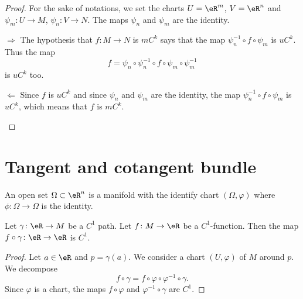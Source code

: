 \begin{proof}
    For the sake of notations, we set the charts \( U=\eR^m\), \( V=\eR^n\) and \( \psi_m\colon U\to M\), \( \psi_n\colon V\to N\). The maps \( \psi_n\) and \( \psi_m\) are the identity.
    \begin{subproof}
    \item[\( \Rightarrow\)]
        The hypothesis that \( f\colon M\to N\) is \( mC^k\) says that the map \( \psi_n^{-1}\circ f\circ\psi_m\) is \( uC^k\). Thus the map
        \begin{equation}
            f=\psi_n\circ\psi_n^{-1}\circ f\circ\psi_m\circ\psi_m^{-1}
        \end{equation}
        is \( uC^k\) too.
    \item[\( \Leftarrow\)]
        Since \( f\) is \( uC^k\) and since \( \psi_n\) and \( \psi_m\) are the identity, the map \( \psi_n^{-1}\circ f\circ\psi_m\) is \( uC^k\), which means that \( f\) is \( mC^k\).
    \end{subproof}
\end{proof}


\section{Tangent and cotangent bundle}

\begin{definition}
    An open set \( \Omega\subset \eR^n\) is a manifold with the identify chart \( (\Omega, \varphi)\) where \( \phi\colon \Omega\to \Omega\) is the identity.
\end{definition}

\begin{lemma}
    Let \( \gamma\colon \eR\to M\) be a \( C^1\) path. Let \( f\colon M\to \eR\) be a \( C^1\)-function. Then the map \( f\circ \gamma\colon \eR\to \eR\) is \( C^1\).   
\end{lemma}

\begin{proof}
    Let \( a\in \eR\) and \( p=\gamma(a)\). We consider a chart \( (U,\varphi)\) of \( M\) around \( p\). We decompose
    \begin{equation}
        f\circ \gamma= f\circ \varphi\circ \varphi^{-1}\circ\gamma.
    \end{equation}
    Since \( \varphi\) is a chart, the maps \( f\circ\varphi\) and \( \varphi^{-1}\circ\gamma\) are \( C^1\).
\end{proof}



